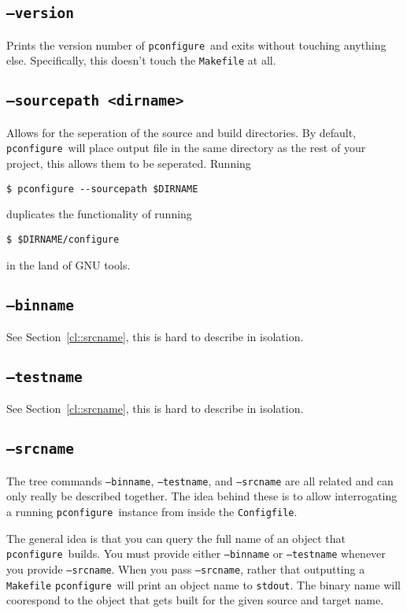 \documentclass{article}
\newcommand{\pconfigure}{\texttt{pconfigure}}
\begin{document}
\subsection{\texttt{--version}}

Prints the version number of \pconfigure\ and exits without touching
anything else.  Specifically, this doesn't touch the \texttt{Makefile}
at all.

\subsection{\texttt{--sourcepath <dirname>}}

Allows for the seperation of the source and build directories.  By
default, \pconfigure\ will place output file in the same directory as
the rest of your project, this allows them to be seperated.  Running
\begin{verbatim}
$ pconfigure --sourcepath $DIRNAME
\end{verbatim}
duplicates the functionality of running
\begin{verbatim}
$ $DIRNAME/configure
\end{verbatim}
in the land of GNU tools.

\subsection{\texttt{--binname}}

See Section~\ref{cl::srcname}, this is hard to describe in isolation.

\subsection{\texttt{--testname}}

See Section~\ref{cl::srcname}, this is hard to describe in isolation.

\subsection{\texttt{--srcname} \label{cl::srcname}}

The tree commands \texttt{--binname}, \texttt{--testname}, and
\texttt{--srcname} are all related and can only really be described
together.  The idea behind these is to allow interrogating a running
\pconfigure\ instance from inside the \texttt{Configfile}.

The general idea is that you can query the full name of an object that
\pconfigure\ builds.  You must provide either \texttt{--binname} or
\texttt{--testname} whenever you provide \texttt{--srcname}.  When you
pass \texttt{--srcname}, rather that outputting a \texttt{Makefile}
\pconfigure\ will print an object name to \texttt{stdout}.  The binary
name will coorespond to the object that gets built for the given
source and target name.
\end{document}
